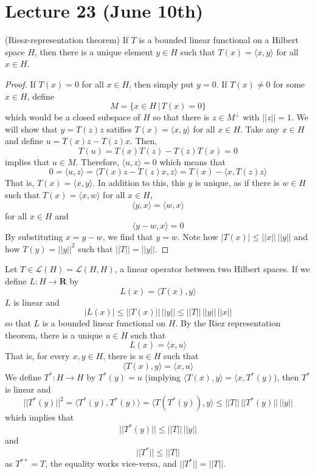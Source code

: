 \section{Lecture 23 (June 10th)}
\begin{thm}
(Riesz-representation theorem) If $T$ is a bounded linear functional on a Hilbert space $H$, then there is a unique element $y\in H$ such that $T(x)=\langle x,y\rangle $ for all $x\in H$. 
\end{thm}
\vspace{2ex}
\begin{proof}
If $T(x)=0$ for all $x\in H$, then simply put $y=0$. If $T(x)\ne 0$ for some $x\in H$, define
\[M=\{x\in H \,|\, T(x)=0\}\]
which would be a closed subspace of $H$ so that there is $z\in M^{\perp}$ with $||z||=1$. We will show that $y=T(z)z$ satifies $T(x)=\langle x,y\rangle $ for all $x\in H$. Take any $x\in H$ and define $u=T(x)z-T(z)x$. Then,
\[T(u)=T(x)T(z)-T(z)T(x)=0\]
implies that $u\in M$. Therefore, $\langle u,z\rangle =0$ which means that 
\[0=\langle u,z\rangle =\langle T(x)z-T(z)x,z\rangle =T(x)-\langle x,T(z)z\rangle \]
That is, $T(x)=\langle x,y\rangle $. In addition to this, this $y$ is unique, as if there is $w\in H$ such that $T(x)=\langle x,w\rangle $ for all $x\in H$,
\[\langle y,x\rangle =\langle w,x\rangle \]
for all $x\in H$ and 
\[\langle y-w,x\rangle =0\]
By substituting $x=y-w$, we find that $y=w$. Note how $|T(x)|\leq ||x||\,||y||$ and how $T(y)=||y||^2$ such that $||T||=||y||$.
\end{proof}
\vspace{2ex}
\begin{thm}
Let $T\in \mathcal{L}(H)=\mathcal{L}(H,H)$, a linear operator between two Hilbert spaces. If we define $L:H\rightarrow {\bm R}$ by 
\[L(x)=\langle T(x),y\rangle \] 
$L$ is linear and 
\[|L(x)|\leq ||T(x)||\,||y||\leq ||T||\,||y||\,||x||\]
so that $L$ is a bounded linear functional on $H$. By the Riez representation theorem, there is a unique $u\in H$ such that 
\[L(x)=\langle x,u\rangle \]
That is, for every $x,y\in H$, there is $u\in H$ such that 
\[\langle T(x),y\rangle =\langle x,u\rangle \]
We define $T^{*}:H\rightarrow H$ by $T^{*}(y)=u$ (implying $\langle T(x),y\rangle =\langle x,T^{*}(y)$), then $T^{*}$ is linear and
\[||T^{*}(y)||^2=\langle T^{*}(y),T^{*}(y)\rangle =\langle T(T^{*}(y)),y\rangle \leq ||T||\,||T^{*}(y)||\,||y||\]
which implies that 
\[||T^{*}(y)||\leq ||T||\,||y||\]
and 
\[||T^{*}||\leq ||T||\]
as $T^{**}=T$, the equality works vice-versa, and $||T^{*}||=||T||$.
\end{thm}
